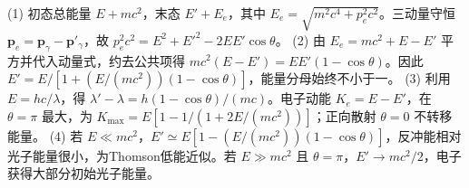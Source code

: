 (1) 初态总能量 \(E+mc^2\)，末态 \(E'+E_e\)，其中 \(E_e=\sqrt{m^2c^4+p_e^2c^2}\)。三动量守恒 \(\mathbf p_e=\mathbf p_\gamma-\mathbf p'_\gamma\)，故 \(p_e^2c^2=E^2+E'^2-2EE'\cos\theta\)。
(2) 由 \(E_e=mc^2+E-E'\) 平方并代入动量式，约去公共项得 \(mc^2(E-E')=EE'(1-\cos\theta)\)。因此 \(E'=E/[1+(E/(mc^2))(1-\cos\theta)]\)，能量分母始终不小于一。
(3) 利用 \(E=hc/\lambda\)，得 \(\lambda'-\lambda=h(1-\cos\theta)/(mc)\)。电子动能 \(K_e=E-E'\)，在 \(\theta=\pi\) 最大，为 \(K_{\max}=E[1-1/(1+2E/(mc^2))]\)；正向散射 \(\theta=0\) 不转移能量。
(4) 若 \(E\ll mc^2\)，\(E'\simeq E[1-(E/(mc^2))(1-\cos\theta)]\)，反冲能相对光子能量很小，为Thomson低能近似。若 \(E\gg mc^2\) 且 \(\theta=\pi\)，\(E'\to mc^2/2\)，电子获得大部分初始光子能量。

